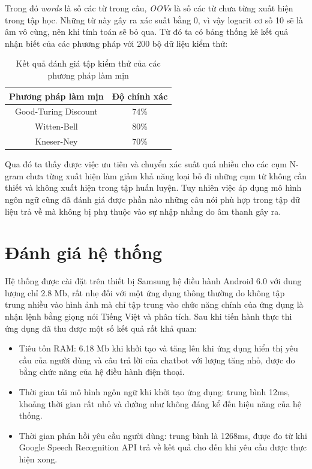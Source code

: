 \documentclass[12pt]{report}
\begin{document}
Trong đó \textit{words} là số các từ trong câu, \textit{OOVs} là số các từ chưa từng xuất hiện trong tập học. Những từ này gây ra xác suất bằng 0, vì vậy logarit cơ số 10 sẽ là âm vô cùng, nên khi tính toán sẽ bỏ qua. Từ đó ta có bảng thống kê kết quả nhận biết của các phương pháp với 200 bộ dữ liệu kiểm thử:
\begin{table}[h]
	\caption{Kết quả đánh giá tập kiểm thử của các phương pháp làm mịn}
	\centering
	\begin{tabular}{ | c | c | }
	\hline
	Phương pháp làm mịn & Độ chính xác \\
	\hline
	Good-Turing Discount & 74\% \\
	\hline
	Witten-Bell & 80\% \\
	\hline
	Kneser-Ney & 70\% \\
	\hline
	\end{tabular}
\end{table}

Qua đó ta thấy được việc ưu tiên và chuyển xác suất quá nhiều cho các cụm N-gram chưa từng xuất hiện làm giảm khả năng loại bỏ đi những cụm từ không cần thiết và không xuất hiện trong tập huấn luyện. Tuy nhiên việc áp dụng mô hình ngôn ngữ cũng đã đánh giá được phần nào những câu nói phù hợp trong tập dữ liệu trả về mà không bị phụ thuộc vào sự nhập nhằng do âm thanh gây ra. 

\section{Đánh giá hệ thống}

Hệ thống được cài đặt trên thiết bị Samsung hệ điều hành Android 6.0 với dung lượng chỉ 2.8 Mb, rất nhẹ đối với một ứng dụng thông thường do không tập trung nhiều vào hình ảnh mà chỉ tập trung vào chức năng chính của ứng dụng là nhận lệnh bằng giọng nói Tiếng Việt và phân tích. Sau khi tiến hành thực thi ứng dụng đã thu được một số kết quả rất khả quan:

\begin{itemize}
	\item Tiêu tốn RAM: 6.18 Mb khi khởi tạo và tăng lên khi ứng dụng hiển thị yêu cầu của người dùng và câu trả lời của chatbot với lượng tăng nhỏ, được đo bằng chức năng của hệ điều hành điện thoại.
	\item Thời gian tải mô hình ngôn ngữ khi khởi tạo ứng dụng: trung bình 12ms, khoảng thời gian rất nhỏ và dường như không đáng kể đến hiệu năng của hệ thống.
	\item Thời gian phản hồi yêu cầu người dùng: trung bình là 1268ms, được đo từ khi Google Speech Recognition API trả về kết quả cho đến khi yêu cầu được thực hiện xong.
\end{itemize}
\end{document}
